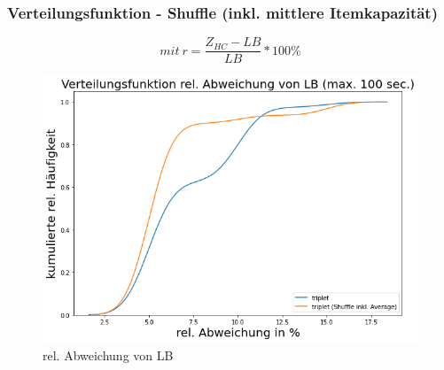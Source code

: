 \documentclass{beamer}
\begin{document}
%
%
%
%
\begin{frame}

\frametitle{Verteilungsfunktion - Shuffle (inkl. mittlere Itemkapazität)}

\begin{footnotesize}
\begin{equation}
mit \ r = \frac{Z_{HC}-LB}{LB} * 100\%
\end{equation}
\end{footnotesize}

\begin{figure}[!htbp]
\begin{center}
\includegraphics[scale=0.3]{img/dist_trip2.png}
\end{center}
\caption{rel. Abweichung von LB}
\label{fig:architecture}
\end{figure}



\end{frame}
\end{document}
